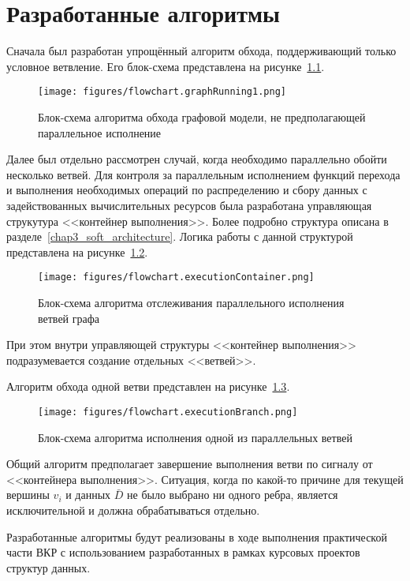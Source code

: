 \chapter{Разработанные алгоритмы}\label{chap2_algorithms}
Сначала был разработан упрощённый алгоритм обхода, поддерживающий только условное ветвление. Его блок-схема представлена на рисунке~\ref{fig:flowchartNoBranching}.
\begin{figure}[!ht]
    \centering
    \texttt{[image: figures/flowchart.graphRunning1.png]}
    \caption{Блок-схема алгоритма обхода графовой модели, не предполагающей параллельное исполнение}
    \label{fig:flowchartNoBranching}
\end{figure}

Далее был отдельно рассмотрен случай, когда необходимо параллельно обойти несколько ветвей. Для контроля за параллельным исполнением функций перехода и выполнения необходимых операций по распределению и сбору данных с задействованных вычислительных ресурсов была разработана управляющая струкутура <<контейнер выполнения>>. Более подробно структура описана в разделе~\ref{chap3_soft_architecture}. Логика работы с данной структурой представлена на рисунке~\ref{fig:flowchartExecutionContainer}. 
\begin{figure}[H]
    \centering
    \texttt{[image: figures/flowchart.executionContainer.png]}
    \caption{Блок-схема алгоритма отслеживания параллельного исполнения ветвей графа}
    \label{fig:flowchartExecutionContainer}
\end{figure}

При этом внутри управляющей структуры <<контейнер выполнения>> подразумевается создание отдельных <<ветвей>>. 

Алгоритм обхода одной ветви представлен на рисунке~\ref{fig:flowchartExecutionBranch}.

\begin{figure}[H]
    \centering
    \texttt{[image: figures/flowchart.executionBranch.png]}
    \caption{Блок-схема алгоритма исполнения одной из параллельных ветвей}
    \label{fig:flowchartExecutionBranch}
\end{figure}

Общий алгоритм предполагает завершение выполнения ветви по сигналу от <<контейнера выполнения>>. Ситуация, когда по какой-то причине для текущей вершины $v_i$ и данных $\bar{D}$ не было выбрано ни одного ребра, является исключительной и должна обрабатываться отдельно.

Разработанные алгоритмы будут реализованы в ходе выполнения практической части ВКР с использованием разработанных в рамках курсовых проектов структур данных. 

